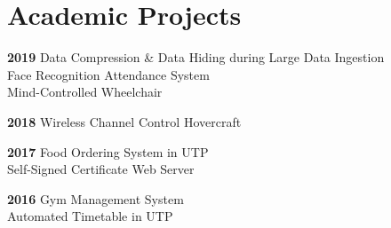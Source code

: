\section{Academic Projects}
\vspace{-0.2cm}
\textbf{2019}
    \vspace{0.1mm} {\quad \quad Data Compression \& Data Hiding during Large Data Ingestion} \\
    \vspace{0.1mm} {\quad \quad \quad \quad Face Recognition Attendance System} \\
    \vspace{0.1mm} {\quad \quad \quad \quad Mind-Controlled Wheelchair} 
    
\textbf{2018}
    \vspace{0.1mm} {\quad \quad Wireless Channel Control Hovercraft}    
 
\textbf{2017}
    \vspace{0.1mm} {\quad \quad Food Ordering System in UTP} \\
    \vspace{0.1mm} {\quad \quad \quad \quad Self-Signed Certificate Web Server}
    
\textbf{2016}   
    \vspace{0.1mm} {\quad \quad Gym Management System}\\
    \vspace{0.1mm} {\quad \quad \quad \quad Automated Timetable in UTP} 
